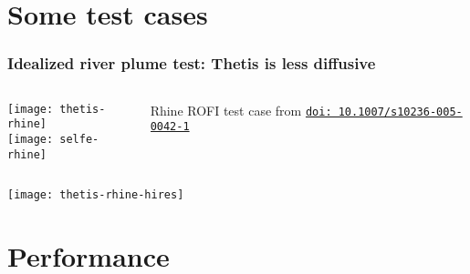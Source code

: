 \documentclass{beamer}
\newcommand{\doilink}[1]{%
  \href{http://dx.doi.org/#1}%
  {{\small\texttt{doi:\,#1}{}}}%
}
\begin{document}
\section{Some test cases}

\begin{frame}
  \frametitle{Idealized river plume test: Thetis is less diffusive}
  \begin{columns}
    \begin{column}{0.75\textwidth}
        \texttt{[image: thetis-rhine]}\\
        \texttt{[image: selfe-rhine]}
    \end{column}
    \hspace{-2em}
    \begin{column}{0.4\textwidth}
      Rhine ROFI test case from \cite{Boer:2006} \doilink{10.1007/s10236-005-0042-1}
    \end{column}
  \end{columns}
\end{frame}

\bgroup
{}
\begin{frame}[standout]
  \hspace*{-2em}\texttt{[image: thetis-rhine-hires]}
\end{frame}
\egroup

\section{Performance}
\end{document}
